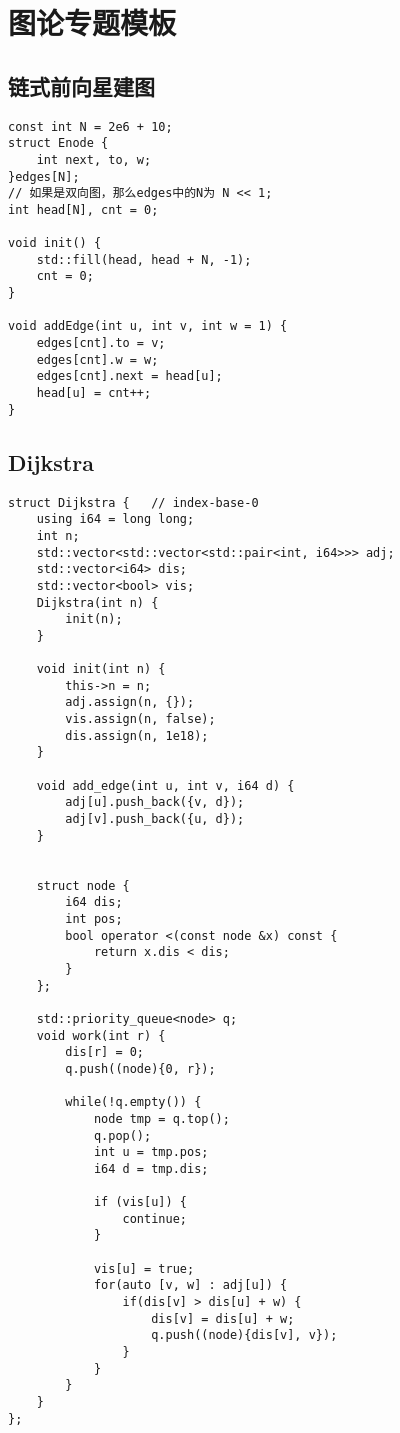 \section{图论专题模板}
\subsection{链式前向星建图}
\begin{lstlisting}
const int N = 2e6 + 10;
struct Enode {
    int next, to, w;
}edges[N];
// 如果是双向图，那么edges中的N为 N << 1;
int head[N], cnt = 0;

void init() {
    std::fill(head, head + N, -1);
    cnt = 0;
}

void addEdge(int u, int v, int w = 1) {
    edges[cnt].to = v;
    edges[cnt].w = w;
    edges[cnt].next = head[u];
    head[u] = cnt++;
}
\end{lstlisting}



\subsection{Dijkstra}
\begin{lstlisting}
struct Dijkstra {   // index-base-0
    using i64 = long long;
    int n;
    std::vector<std::vector<std::pair<int, i64>>> adj;
    std::vector<i64> dis;
    std::vector<bool> vis;
    Dijkstra(int n) {
        init(n);
    }

    void init(int n) {
        this->n = n;
        adj.assign(n, {});
        vis.assign(n, false);
        dis.assign(n, 1e18);
    }
 
    void add_edge(int u, int v, i64 d) {
        adj[u].push_back({v, d});
        adj[v].push_back({u, d});
    }
 

    struct node {
        i64 dis;
        int pos;
        bool operator <(const node &x) const {
            return x.dis < dis;
        }
    };
 
    std::priority_queue<node> q;
    void work(int r) {
        dis[r] = 0;
        q.push((node){0, r});
 
        while(!q.empty()) {
            node tmp = q.top();
            q.pop();
            int u = tmp.pos;
            i64 d = tmp.dis;
 
            if (vis[u]) {
                continue;
            }
 
            vis[u] = true;
            for(auto [v, w] : adj[u]) {
                if(dis[v] > dis[u] + w) {
                    dis[v] = dis[u] + w;
                    q.push((node){dis[v], v});
                }
            }
        }
    }
};
\end{lstlisting}

